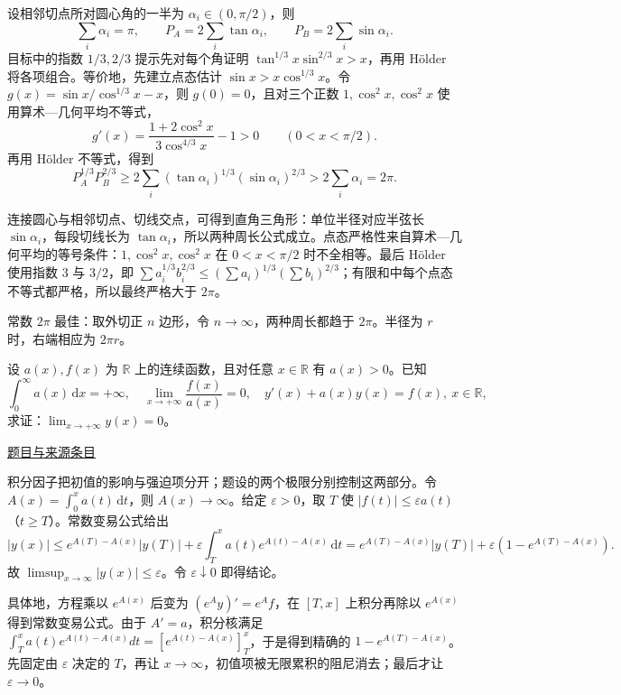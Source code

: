 \documentclass[UTF8,12pt,a4paper,fontset=fandol]{ctexart}
\begin{document}
\begin{solve}\label{ans:fin07-hi:7}

设相邻切点所对圆心角的一半为 $\alpha_i\in(0,\pi/2)$，则
\[
\sum_i\alpha_i=\pi,\qquad P_A=2\sum_i\tan\alpha_i,\qquad P_B=2\sum_i\sin\alpha_i.
\]
目标中的指数 $1/3,2/3$ 提示先对每个角证明 $\tan^{1/3}x\sin^{2/3}x>x$，再用 Hölder 将各项组合。等价地，先建立点态估计 $\sin x>x\cos^{1/3}x$。令 $g(x)=\sin x/\cos^{1/3}x-x$，则 $g(0)=0$，且对三个正数 $1,\cos^2x,\cos^2x$ 使用算术---几何平均不等式，
\[
g'(x)=\frac{1+2\cos^2x}{3\cos^{4/3}x}-1>0\qquad(0<x<\pi/2).
\]
再用 Hölder 不等式，得到
\[
P_A^{1/3}P_B^{2/3}\geq2\sum_i(\tan\alpha_i)^{1/3}(\sin\alpha_i)^{2/3}>2\sum_i\alpha_i=2\pi.
\]

连接圆心与相邻切点、切线交点，可得到直角三角形：单位半径对应半弦长 $\sin\alpha_i$，每段切线长为 $\tan\alpha_i$，所以两种周长公式成立。点态严格性来自算术—几何平均的等号条件：$1,\cos^2x,\cos^2x$ 在 $0<x<\pi/2$ 时不全相等。最后 Hölder 使用指数 $3$ 与 $3/2$，即 $\sum a_i^{1/3}b_i^{2/3}\le(\sum a_i)^{1/3}(\sum b_i)^{2/3}$；有限和中每个点态不等式都严格，所以最终严格大于 $2\pi$。

\end{solve}

\begin{remark}[方法与条件]常数 $2\pi$ 最佳：取外切正 $n$ 边形，令 $n\to\infty$，两种周长都趋于 $2\pi$。半径为 $r$ 时，右端相应为 $2\pi r$。\end{remark}

\begin{example}\label{ex:fin07-lo:8}\label{pr:fin07-lo:8}

设 $a(x),f(x)$ 为 $\mathbb{R}$ 上的连续函数，且对任意 $x\in\mathbb{R}$ 有 $a(x)>0$。已知
\[
\int_{0}^{\infty}a(x)\,\mathrm{d}x=+\infty,\quad \lim_{x\to+\infty}\frac{f(x)}{a(x)}=0,\quad y'(x)+a(x)y(x)=f(x),\ x\in\mathbb{R},
\]
求证：$\lim_{x\to+\infty}y(x)=0$。

\par\href{https://github.com/lzxcr/cmc-mathematics/blob/64916fa1fdbc3e444a652eca204d5669058ee321/src/problems/finals/07/08.md}{题目与来源条目}

\end{example}

\begin{solve}\label{ans:fin07-lo:8}

积分因子把初值的影响与强迫项分开；题设的两个极限分别控制这两部分。令 $A(x)=\int_0^xa(t)\,\mathrm{d}t$，则 $A(x)\to\infty$。给定 $\varepsilon>0$，取 $T$ 使 $|f(t)|\leq\varepsilon a(t)$（$t\geq T$）。常数变易公式给出
\[
|y(x)|\leq e^{A(T)-A(x)}|y(T)|+\varepsilon\int_T^xa(t)e^{A(t)-A(x)}\,\mathrm{d}t
=e^{A(T)-A(x)}|y(T)|+\varepsilon(1-e^{A(T)-A(x)}).
\]
故 $\limsup_{x\to\infty}|y(x)|\leq\varepsilon$。令 $\varepsilon\downarrow0$ 即得结论。

具体地，方程乘以 $e^{A(x)}$ 后变为 $(e^Ay)'=e^Af$，在 $[T,x]$ 上积分再除以 $e^{A(x)}$ 得到常数变易公式。由于 $A'=a$，积分核满足 $\int_T^xa(t)e^{A(t)-A(x)}dt=[e^{A(t)-A(x)}]_T^x$，于是得到精确的 $1-e^{A(T)-A(x)}$。先固定由 $\varepsilon$ 决定的 $T$，再让 $x\to\infty$，初值项被无限累积的阻尼消去；最后才让 $\varepsilon\to0$。

\end{solve}
\end{document}
